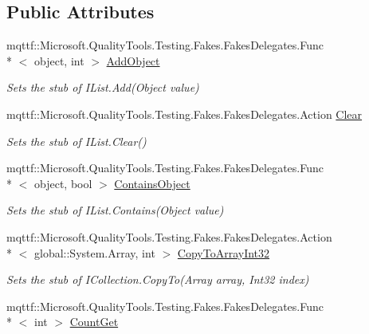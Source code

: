 \subsection*{Public Attributes}
\begin{DoxyCompactItemize}
\item 
mqttf\-::\-Microsoft.\-Quality\-Tools.\-Testing.\-Fakes.\-Fakes\-Delegates.\-Func\\*
$<$ object, int $>$ \hyperlink{class_system_1_1_collections_1_1_fakes_1_1_stub_i_list_a93c434d2570207113b14d9f38c0b6ac8}{Add\-Object}
\begin{DoxyCompactList}\small\item\em Sets the stub of I\-List.\-Add(\-Object value)\end{DoxyCompactList}\item 
mqttf\-::\-Microsoft.\-Quality\-Tools.\-Testing.\-Fakes.\-Fakes\-Delegates.\-Action \hyperlink{class_system_1_1_collections_1_1_fakes_1_1_stub_i_list_a2a5232d5477f2a8cfba2d45e7b8ab164}{Clear}
\begin{DoxyCompactList}\small\item\em Sets the stub of I\-List.\-Clear()\end{DoxyCompactList}\item 
mqttf\-::\-Microsoft.\-Quality\-Tools.\-Testing.\-Fakes.\-Fakes\-Delegates.\-Func\\*
$<$ object, bool $>$ \hyperlink{class_system_1_1_collections_1_1_fakes_1_1_stub_i_list_aa6021fbb2dcc379e2e343d36db8a96eb}{Contains\-Object}
\begin{DoxyCompactList}\small\item\em Sets the stub of I\-List.\-Contains(\-Object value)\end{DoxyCompactList}\item 
mqttf\-::\-Microsoft.\-Quality\-Tools.\-Testing.\-Fakes.\-Fakes\-Delegates.\-Action\\*
$<$ global\-::\-System.\-Array, int $>$ \hyperlink{class_system_1_1_collections_1_1_fakes_1_1_stub_i_list_ae5a4a789a76f1fa825c824e4e6f7c60f}{Copy\-To\-Array\-Int32}
\begin{DoxyCompactList}\small\item\em Sets the stub of I\-Collection.\-Copy\-To(\-Array array, Int32 index)\end{DoxyCompactList}\item 
mqttf\-::\-Microsoft.\-Quality\-Tools.\-Testing.\-Fakes.\-Fakes\-Delegates.\-Func\\*
$<$ int $>$ \hyperlink{class_system_1_1_collections_1_1_fakes_1_1_stub_i_list_ab795453a58cf894f7563d83f4aa24f2b}{Count\-Get}

\end{DoxyCompactItemize}

